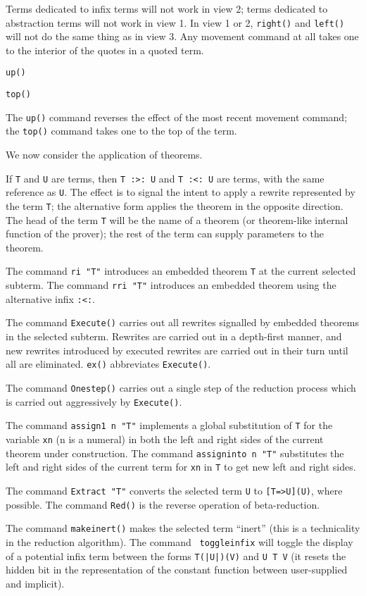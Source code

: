 \documentclass[12pt]{article}
\begin{document}
Terms dedicated to infix terms will not work in view 2; terms dedicated to
abstraction terms will not work in view 1.  In view 1 or 2, {\tt right()}
and {\tt left()} will not do the same thing as in view 3.  Any movement
command at all takes one to the interior of the quotes in a quoted term.

{\tt up()}

{\tt top()}

The {\tt up()} command reverses the effect of the most recent movement command;
the {\tt top()} command takes one to the top of the term.

We now consider the application of theorems.

If {\tt T} and {\tt U} are terms, then {\tt T :>: U} and {\tt T :<: U}
are terms, with the same reference as {\tt U}.  The effect is to
signal the intent to apply a rewrite represented by the term {\tt T};
the alternative form applies the theorem in the opposite direction.
The head of the term {\tt T} will be the name of a theorem (or
theorem-like internal function of the prover); the rest of the term can
supply parameters to the theorem.

The command {\tt ri "T"} introduces an embedded theorem {\tt T} at the
current selected subterm.  The command {\tt rri "T"} introduces an embedded
theorem using the alternative infix {\tt :<:}.

The command {\tt Execute()} carries out all rewrites signalled by
embedded theorems in the selected subterm.  Rewrites are carried out in
a depth-first manner, and new rewrites introduced by executed rewrites are
carried out in their turn until all are eliminated.  {\tt ex()} abbreviates
{\tt Execute()}.

The command {\tt Onestep()} carries out a single step of the reduction
process which is carried out aggressively by {\tt Execute()}.

The command {\tt assign1 n "T"} implements a global substitution of
{\tt T} for the variable {\tt xn} (n is a numeral) in both the left
and right sides of the current theorem under construction.  The
command {\tt assigninto n "T"} substitutes the left and right sides of
the current term for {\tt xn} in {\tt T} to get new left and right
sides.

The command {\tt Extract "T"} converts the selected term {\tt U} to
{\tt [T=>U](U)}, where possible.  The command {\tt Red()} is the
reverse operation of beta-reduction.

The command {\tt makeinert()} makes the selected term ``inert'' (this
is a technicality in the reduction algorithm).  The command {\tt
toggleinfix\/} will toggle the display of a potential infix term
between the forms {\tt T(|U|)(V)} and {\tt U T V} (it resets the
hidden bit in the representation of the constant function between
user-supplied and implicit).
\end{document}
